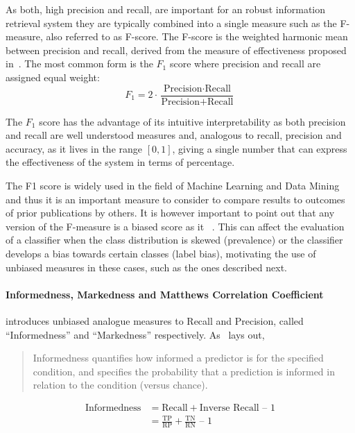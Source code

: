 As both, high precision and recall, are important for an robust information retrieval system they are typically combined into a single measure such as the F-measure, also referred to as F-score. The F-score is the weighted harmonic mean between precision and recall, derived from the measure of effectiveness proposed in~\cite{Rijsbergen:1979aa}. The most common form is the $F_1$ score  where precision and recall are assigned equal weight:
\begin{equation}
  \label{f1measure}
  F_1 = 2 \cdot \frac{\text{Precision} \cdot \text{Recall}}{\text{Precision} + \text{Recall}}
\end{equation}

The $F_1$ score has the advantage of its intuitive interpretability as both precision and recall are well understood measures and, analogous to recall, precision and accuracy, as it lives in the range $[0,1]$, giving a single number that can express the effectiveness of the system in terms of percentage.

The F1 score is widely used in the field of Machine Learning and Data Mining and thus it is an important measure to consider to compare results to outcomes of prior publications by others.
It is however important to point out that any version of the F-measure is a biased score as it ~\cite{Powers:2011aa}. This can affect the evaluation of a classifier when the class distribution is skewed (prevalence) or the classifier develops a bias towards certain classes (label bias), motivating the use of unbiased measures in these cases, such as the ones described next.

\paragraph{Informedness, Markedness and Matthews Correlation Coefficient}
\label{par:Informedness, Markedness and Matthews Correlation Coefficient}

\cite{Powers:2011aa} introduces unbiased analogue measures to Recall and Precision, called ``Informedness'' and ``Markedness'' respectively. As~\cite{Powers:2011aa} lays out, \blockquote{Informedness quantifies how informed a predictor is for the specified condition, and specifies the probability that a prediction is informed in relation to the condition (versus chance).}:

\begin{equation}
  \begin{split}
  \text{Informedness} &= \text{Recall} + \text{Inverse Recall} \text{ – } 1 \\
  &=\frac{\text{TP}}{ \text{RP}} + \frac{\text{TN}}{\text{RN}} \text{ – } 1
  \end{split}
\end{equation}

